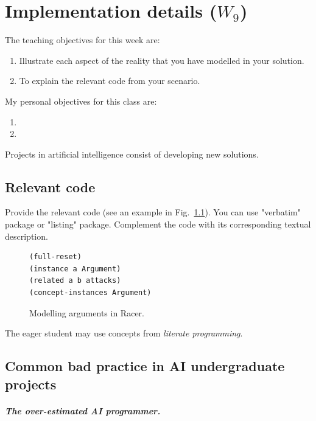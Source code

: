 \documentclass[a4paper,12pt]{report}
\begin{document}
\chapter{Implementation details ($W_9$)}

The teaching objectives for this week are:
\begin{enumerate}
 \item Illustrate each aspect of the reality that you have 
 modelled in your solution.
\item To explain the relevant code from your scenario.
\end{enumerate}

\vspace{0.5cm}

My personal objectives for this class are:
\begin{enumerate}
 \item 
 \item 
\end{enumerate}

Projects in artificial intelligence consist of developing new solutions. 


\section{Relevant code}

Provide the relevant code (see an example in Fig.~\ref{fig:code}).
You can use "verbatim" package or "listing" package. 
Complement the code with its corresponding textual description.

\begin{figure}
\begin{verbatim}
(full-reset)
(instance a Argument)
(related a b attacks)
(concept-instances Argument) 
\end{verbatim}
\caption{Modelling arguments in Racer.}
\label{fig:code} 
\end{figure}

The eager student may use concepts from \textit{literate programming}.

\section{Common bad practice in AI undergraduate projects}

\paragraph{The over-estimated AI programmer.} $ $
\end{document}
